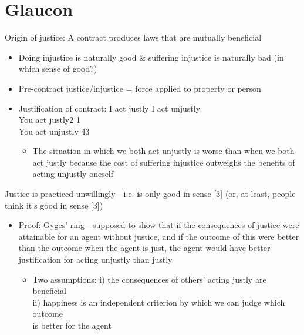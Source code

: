 \documentclass[11pt]{article}
\begin{document}
\section*{Glaucon}

\noindent Origin of justice: A contract produces laws that are mutually beneficial

\begin{itemize}\item{Doing injustice is naturally good \& suffering injustice is naturally bad (in which sense of good?)}\item{Pre-contract justice/injustice = force applied to property or person}\item{Justification of contract: I act justly\hspace*{5mm} I act unjustly\\\hspace*{14mm} You act justly\hspace*{8mm}2\hspace*{20mm} 1\\\hspace*{14mm}You act unjustly\hspace*{4mm} 4\hspace*{21mm}3}\begin{itemize}\item{The situation in which we both act unjustly is worse than when we both act justly because the cost of suffering injustice outweighs the benefits of acting unjustly oneself}\end{itemize}
\end{itemize}

\noindent Justice is practiced unwillingly---i.e. is only good in sense [3] (or, at least, people think it's good in sense [3])
\begin{itemize}\item{Proof: Gyges' ring---supposed to show that if the consequences of justice were attainable for an agent without justice, and if the outcome of this were better than the outcome when the agent is just, the agent would have better justification for acting unjustly than justly}\begin{itemize}\item{Two assumptions: i) the consequences of others' acting justly are beneficial\\\hspace*{28mm}ii) happiness is an independent criterion by which we can judge which outcome\\\hspace*{32mm}is better for the agent}\end{itemize}\end{itemize}
\end{document}
